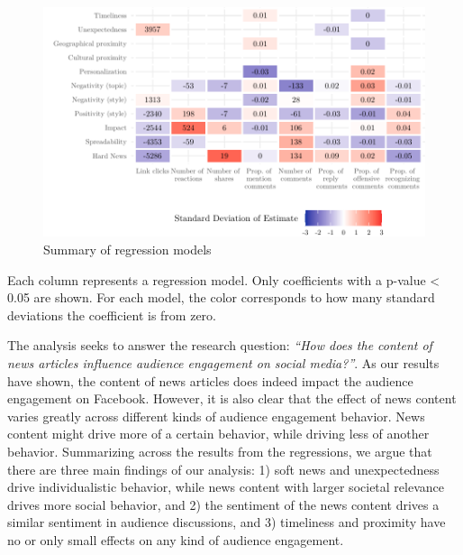 \documentclass[
]{article}
\begin{document}
\begin{figure}[H]

{\centering \includegraphics[width=0.8\linewidth]{paper_files/figure-latex/coef_matrix-1} 

}

\caption{Summary of regression models}\label{fig:coef_matrix}
\end{figure}

\begin{center}
\small
Each column represents a regression model. Only coefficients with a p-value < 0.05 are shown. For each model, the color corresponds to how many standard deviations the coefficient is from zero.
\end{center}
\normalsize

\noindent The analysis seeks to answer the research question:
\emph{``How does the content of news articles influence audience
engagement on social media?''}. As our results have shown, the content
of news articles does indeed impact the audience engagement on Facebook.
However, it is also clear that the effect of news content varies greatly
across different kinds of audience engagement behavior. News content
might drive more of a certain behavior, while driving less of another
behavior. Summarizing across the results from the regressions, we argue
that there are three main findings of our analysis: 1) soft news and
unexpectedness drive individualistic behavior, while news content with
larger societal relevance drives more social behavior, and 2) the
sentiment of the news content drives a similar sentiment in audience
discussions, and 3) timeliness and proximity have no or only small
effects on any kind of audience engagement.
\end{document}
